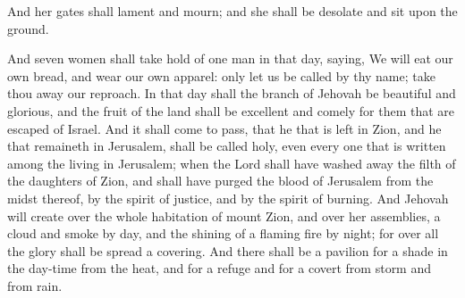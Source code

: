 And her gates shall lament and mourn; and she shall be desolate and sit upon the ground. 

And seven women shall take hold of one man in that day, saying, We will eat our own bread, and wear our own apparel: only let us be called by thy name; take thou away our reproach.  In that day shall the branch of Jehovah be beautiful and glorious, and the fruit of the land shall be excellent and comely for them that are escaped of Israel. And it shall come to pass, that he that is left in Zion, and he that remaineth in Jerusalem, shall be called holy, even every one that is written among the living in Jerusalem; when the Lord shall have washed away the filth of the daughters of Zion, and shall have purged the blood of Jerusalem from the midst thereof, by the spirit of justice, and by the spirit of burning. And Jehovah will create over the whole habitation of mount Zion, and over her assemblies, a cloud and smoke by day, and the shining of a flaming fire by night; for over all the glory shall be spread a covering. And there shall be a pavilion for a shade in the day-time from the heat, and for a refuge and for a covert from storm and from rain. 

